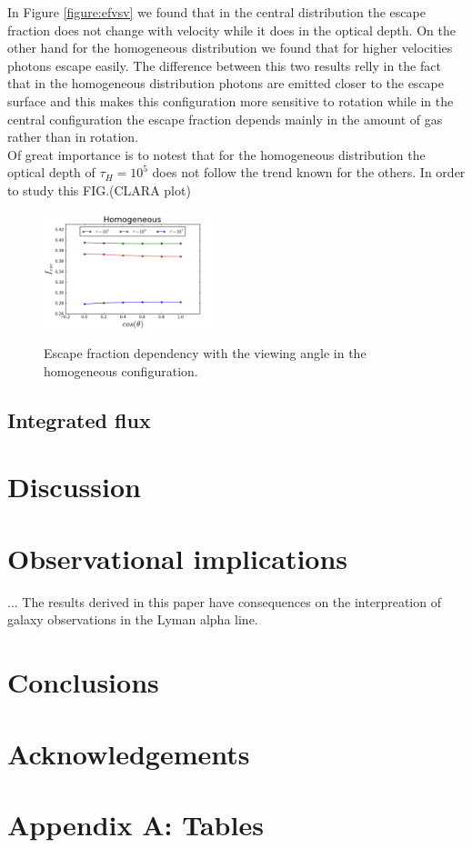 \documentclass[usenatbib]{mn2e}
\begin{document}
In Figure \ref{figure:efvsv} we found that in the central distribution the escape fraction does not change with velocity while it
does in the optical depth. On the other hand for the homogeneous distribution
we found that for higher velocities photons escape easily. The
difference between this two results relly in the fact that in the
homogeneous distribution photons are emitted closer to the escape
surface and this makes this configuration more sensitive to
rotation while in the central configuration the escape fraction depends mainly in the amount of gas rather than in rotation. \\

Of great importance is to notest that for the homogeneous distribution the optical depth of $\tau_{H}=10^5$ does not follow the trend known for the others. In order to study this FIG.(CLARA plot) \\

\begin{figure}
  \includegraphics[width=0.45\textwidth]{FEHomogeneousvsThetaL.png}
 \label{figure:efvstheta}\caption{Escape fraction dependency with the viewing angle in the homogeneous configuration.} 
\end{figure}

\subsection{Integrated flux}


\section{Discussion}
\label{sec:discussion}

\section{Observational implications}

... The results derived in this paper have consequences on the
interpreation of galaxy observations in the Lyman alpha line.

\section{Conclusions}

\section*{Acknowledgements}

\section*{Appendix A: Tables}
\end{document}
